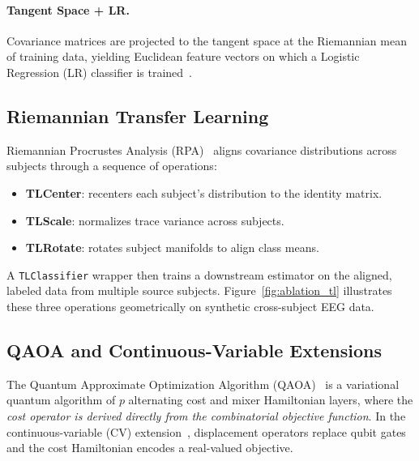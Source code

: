 \documentclass{article}
\begin{document}
\paragraph{Tangent Space + LR.}
Covariance matrices are projected to the tangent space at the Riemannian mean
of training data, yielding Euclidean feature vectors on which a Logistic
Regression (LR) classifier is trained~\cite{yger2017riemannian}.

\subsection{Riemannian Transfer Learning}

Riemannian Procrustes Analysis (RPA)~\cite{rodrigues2019riemannian} aligns
covariance distributions across subjects through a sequence of operations:
\begin{itemize}
  \item \textbf{TLCenter}: recenters each subject's distribution to the
    identity matrix.
  \item \textbf{TLScale}: normalizes trace variance across subjects.
  \item \textbf{TLRotate}: rotates subject manifolds to align class means.
\end{itemize}
A \texttt{TLClassifier} wrapper then trains a downstream estimator on the
aligned, labeled data from multiple source subjects.
Figure~\ref{fig:ablation_tl} illustrates these three operations geometrically
on synthetic cross-subject EEG data.

\subsection{QAOA and Continuous-Variable Extensions}

The Quantum Approximate Optimization Algorithm (QAOA)~\cite{farhi2014quantum} is a
variational quantum algorithm of $p$ alternating cost and mixer Hamiltonian layers,
where the \emph{cost operator is derived directly from the combinatorial objective function}.
In the continuous-variable (CV) extension~\cite{lloyd2018quantum}, displacement
operators replace qubit gates and the cost Hamiltonian encodes a real-valued objective.
\end{document}
